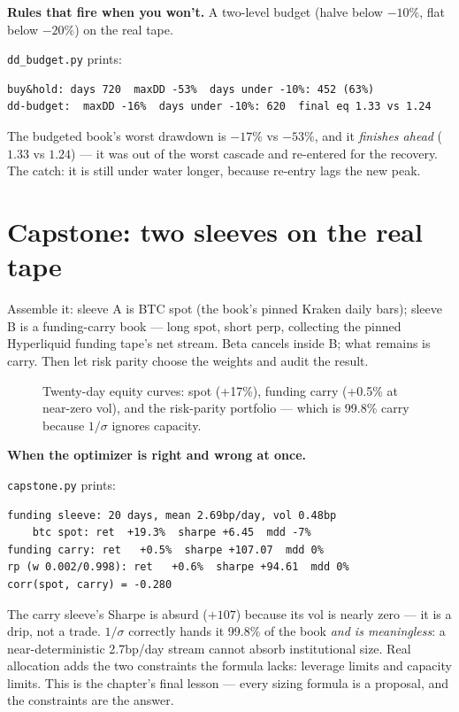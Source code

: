\begin{example}\label{ex:ddbudget}
\textbf{Rules that fire when you won't.} A two-level budget
(halve below $-10\%$, flat below $-20\%$) on the real tape.
\begin{solution}
\texttt{dd\_budget.py} prints:
\begin{verbatim}
buy&hold: days 720  maxDD -53%  days under -10%: 452 (63%)
dd-budget:  maxDD -16%  days under -10%: 620  final eq 1.33 vs 1.24
\end{verbatim}
The budgeted book's worst drawdown is $-17\%$ vs $-53\%$, and it
\emph{finishes ahead} ($1.33$ vs $1.24$) --- it was out of the
worst cascade and re-entered for the recovery. The catch: it is
still under water longer, because re-entry lags the new peak.
\end{solution}
\end{example}

\section{Capstone: two sleeves on the real tape}\label{sec:capstone}

Assemble it: sleeve A is BTC spot (the book's pinned Kraken
daily bars); sleeve B is a funding-carry book --- long spot,
short perp, collecting the pinned Hyperliquid funding tape's
net stream. Beta cancels inside B; what remains is carry. Then
let risk parity choose the weights and audit the result.

\begin{figure}[htbp]\centering

\caption{Twenty-day equity curves: spot (+17\%), funding carry
(+0.5\% at near-zero vol), and the risk-parity portfolio ---
which is 99.8\% carry because $1/\sigma$ ignores capacity.}
\label{fig:capstone}
\end{figure}

\begin{example}\label{ex:capstone}
\textbf{When the optimizer is right and wrong at once.}
\begin{solution}
\texttt{capstone.py} prints:
\begin{verbatim}
funding sleeve: 20 days, mean 2.69bp/day, vol 0.48bp
    btc spot: ret  +19.3%  sharpe +6.45  mdd -7%
funding carry: ret   +0.5%  sharpe +107.07  mdd 0%
rp (w 0.002/0.998): ret   +0.6%  sharpe +94.61  mdd 0%
corr(spot, carry) = -0.280
\end{verbatim}
The carry sleeve's Sharpe is absurd ($+107$) because its vol is
nearly zero --- it is a drip, not a trade. $1/\sigma$ correctly
hands it 99.8\% of the book \emph{and is meaningless}: a
near-deterministic 2.7bp/day stream cannot absorb institutional
size. Real allocation adds the two constraints the formula lacks:
leverage limits and capacity limits. This is the chapter's final
lesson --- every sizing formula is a proposal, and the
constraints are the answer.
\end{solution}
\end{example}

